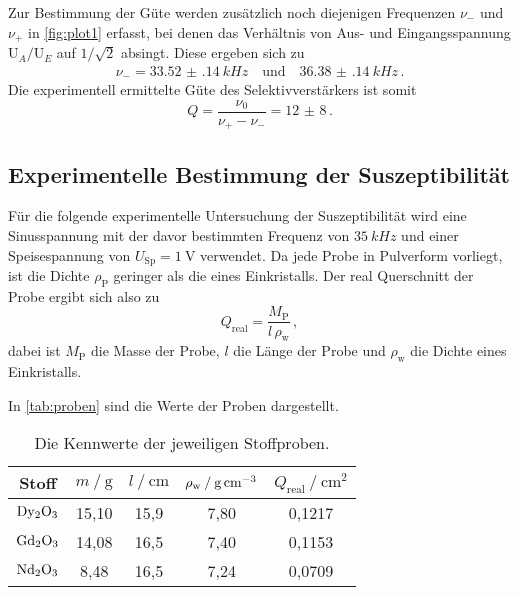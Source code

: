 Zur Bestimmung der Güte werden zusätzlich noch diejenigen Frequenzen $\nu_{-}$ und $\nu_{+}$ in \autoref{fig:plot1} erfasst,
bei denen das Verhältnis von Aus- und Eingangsspannung $\text{U}_{A} / \text{U}_{E}$ auf $1/\sqrt{2}$ absingt.
Diese ergeben sich zu
\begin{align*}
  \nu_{-} = \qty{33.52(14)}{kHz} \quad \text{und} \quad \qty{36.38(14)}{kHz} \, .
\end{align*}
Die experimentell ermittelte Güte des Selektivverstärkers ist somit
\begin{equation}
  Q = \frac{\nu_0}{\nu_{+} - \nu_{-}} = \num{12(8)} \, .
\end{equation}


\subsection{Experimentelle Bestimmung der Suszeptibilität}

Für die folgende experimentelle Untersuchung der Suszeptibilität wird eine Sinusspannung 
mit der davor bestimmten Frequenz von $\qty{35}{kHz}$ und einer Speisespannung von $U_\text{Sp} = \qty{1}{\volt}$ verwendet.
Da jede Probe in Pulverform vorliegt, ist die Dichte $\rho_\text{P}$ geringer als die eines Einkristalls.
Der real Querschnitt der Probe ergibt sich also zu
\begin{equation}
  Q_\text{real} = \frac{M_\text{P}}{l \, \rho_\text{w}} \, ,
\end{equation}
dabei ist $M_\text{P}$ die Masse der Probe, $l$ die Länge der Probe und $\rho_\text{w}$ die Dichte eines Einkristalls.

In \autoref{tab:proben} sind die Werte der Proben dargestellt.
\begin{table}
  \centering
  \caption{Die Kennwerte der jeweiligen Stoffproben.}
  \label{tab:proben}
  \begin{tabular}{c c c c c}
    \toprule
    Stoff &   
    $m \mathbin{/} \mathrm{g}$ &
    $l \mathbin{/} \mathrm{cm}$ &
    $\rho_\text{w} \mathbin{/} \unit[per-mode=reciprocal]{\gram\per\cubic\centi\meter}$ & 
    $Q_\text{real} \mathbin{/} \unit{\centi\meter\squared}$ \\
    \midrule
    $\ce{Dy2O3}$ & 15,10 &  15,9 & 7,80 & 0,1217 \\
    $\ce{Gd2O3}$ & 14,08 &  16,5 & 7,40 & 0,1153 \\
    $\ce{Nd2O3}$ &  8,48 &  16,5 & 7,24 & 0,0709 \\
    \bottomrule
  \end{tabular}
\end{table}

